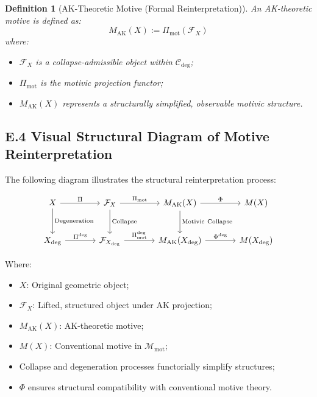 \documentclass[11pt]{article}
\newtheorem{definition}[theorem]{Definition}
\begin{document}
\begin{definition}[AK-Theoretic Motive (Formal Reinterpretation)]
An \emph{AK-theoretic motive} is defined as:
\[
M_{\mathrm{AK}}(X) := \Pi_{\mathrm{mot}}(\mathcal{F}_X)
\]
where:

\begin{itemize}
    \item $\mathcal{F}_X$ is a collapse-admissible object within $\mathcal{C}_{\mathrm{deg}}$;
    \item $\Pi_{\mathrm{mot}}$ is the motivic projection functor;
    \item $M_{\mathrm{AK}}(X)$ represents a structurally simplified, observable motivic structure.
\end{itemize}
\end{definition}

\subsection*{E.4 Visual Structural Diagram of Motive Reinterpretation}

The following diagram illustrates the structural reinterpretation process:

\[
\begin{tikzcd}[column sep=large, row sep=large]
X \arrow[r, "\Pi"] \arrow[d, "\mathrm{Degeneration}"]
& \mathcal{F}_X \arrow[d, "\mathrm{Collapse}"] \arrow[r, "\Pi_{\mathrm{mot}}"]
& M_{\mathrm{AK}}(X) \arrow[d, "\mathrm{Motivic\ Collapse}"] \arrow[r, "\Phi"]
& M(X) \\
X_{\mathrm{deg}} \arrow[r, "\Pi^{\mathrm{deg}}"]
& \mathcal{F}_{X_{\mathrm{deg}}} \arrow[r, "\Pi_{\mathrm{mot}}^{\mathrm{deg}}"]
& M_{\mathrm{AK}}(X_{\mathrm{deg}}) \arrow[r, "\Phi^{\mathrm{deg}}"]
& M(X_{\mathrm{deg}})
\end{tikzcd}
\]

Where:

\begin{itemize}
    \item $X$: Original geometric object;
    \item $\mathcal{F}_X$: Lifted, structured object under AK projection;
    \item $M_{\mathrm{AK}}(X)$: AK-theoretic motive;
    \item $M(X)$: Conventional motive in $\mathcal{M}_{\mathrm{mot}}$;
    \item Collapse and degeneration processes functorially simplify structures;
    \item $\Phi$ ensures structural compatibility with conventional motive theory.
\end{itemize}
\end{document}

